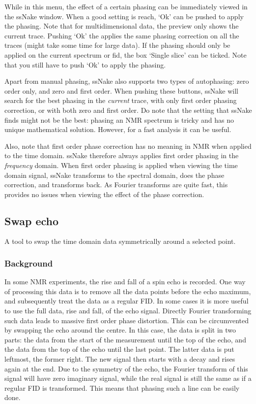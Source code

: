 \documentclass[11pt,a4paper]{article}
\begin{document}
While in this menu, the effect of a certain phasing can be immediately viewed in the ssNake window. When a good setting is reach, `Ok' can be pushed to apply the phasing. Note that for multidimensional data, the preview only shows the current trace. Pushing `Ok' the applies the same phasing correction on all the traces (might take some time for large data). If the phasing should only be applied on the current spectrum or fid, the box `Single slice' can be ticked. Note that you still have to push `Ok' to apply the phasing.

Apart from manual phasing, ssNake also supports two types of autophasing: zero order only, and zero and first order. When pushing these buttons, ssNake will search for the best phasing in the \textit{current} trace, with only first order phasing correction, or with both zero and first order. Do note that the setting that ssNake finds might not be the best: phasing an NMR spectrum is tricky and has no unique mathematical solution. However, for a fast analysis it can be useful.

Also, note that first order phase correction has no meaning in NMR when applied to the time domain. ssNake therefore always applies first order phasing in the \textit{frequency} domain. When first order phasing is applied when viewing the time domain signal, ssNake transforms to the spectral domain, does the phase correction, and transforms back. As Fourier transforms are quite fast, this provides no issues when viewing the effect of the phase correction.



\subsection{Swap echo}
A tool to swap the time domain data symmetrically around a selected point.

\subsubsection*{Background}
In some NMR experiments, the rise and fall of a spin echo is recorded. One way of processing this data is to remove all the data points before the echo maximum, and subsequently treat the data as a regular FID. In some cases it is more useful to use the full data, rise and fall, of the echo signal. Directly Fourier transforming such data leads to massive first order phase distortion. This can be circumvented by swapping the echo around the centre. In this case, the data is split in two parts: the data from the start of the measurement until the top of the echo, and the data from the top of the echo until the last point. The latter data is put leftmost, the former right. The new signal then starts with a decay and rises again at the end. Due to the symmetry of the echo, the Fourier transform of this signal will have zero imaginary signal, while the real signal is still the same as if a regular FID is transformed. This means that phasing such a line can be easily done.
\end{document}
